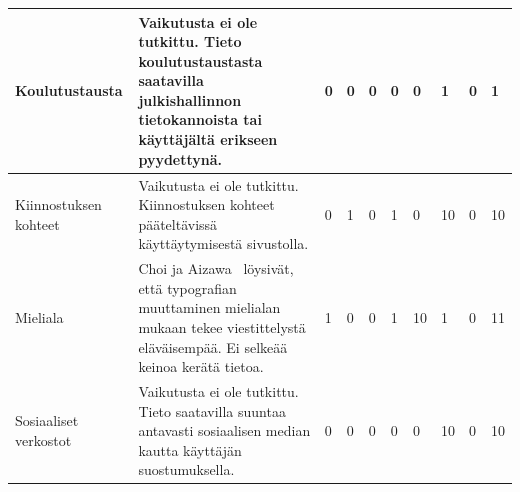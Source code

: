 \documentclass[finnish, 12pt, a4paper, elec, utf8, a-1b]{aaltothesis}
\begin{document}
{\begin{longtable}{p{2.5cm}|p{6cm}|p{0.5cm}p{0.5cm}p{0.5cm}|p{0.5cm}|p{0.5cm}p{0.5cm}p{0.5cm}|p{0.5cm}|}
    \midrule
    Koulutustausta                         & Vaikutusta ei ole tutkittu. Tieto koulutustaustasta saatavilla julkishallinnon tietokannoista tai käyttäjältä erikseen pyydettynä.                                                                                                                            & 0                                          & 0                                   & 0                                      & 0                            & 0                                               & 1                                         & 0                                         & 1                            \\
    \midrule
    Kiinnostuksen kohteet                  & Vaikutusta ei ole tutkittu. Kiinnostuksen kohteet pääteltävissä käyttäytymisestä sivustolla.                                                                                                                                                                  & 0                                          & 1                                   & 0                                      & 1                            & 0                                               & 10                                        & 0                                         & 10                           \\
    \midrule
    Mieliala                               & Choi ja Aizawa~\cite{choi_aizawa_2018} löysivät, että typografian muuttaminen mielialan mukaan tekee viestittelystä eläväisempää. Ei selkeää keinoa kerätä tietoa.                                                                                            & 1                                          & 0                                   & 0                                      & 1                            & 10                                              & 1                                         & 0                                         & 11                           \\
    \midrule
    Sosiaaliset verkostot                  & Vaikutusta ei ole tutkittu. Tieto saatavilla suuntaa antavasti sosiaalisen median kautta käyttäjän suostumuksella.                                                                                                                                            & 0                                          & 0                                   & 0                                      & 0                            & 0                                               & 10                                        & 0                                         & 10                           \\

\end{longtable}}
\end{document}
